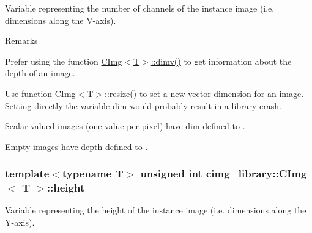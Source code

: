 Variable representing the number of channels of the instance image (i.e. dimensions along the V-\/axis). 

\begin{DoxyRemark}{Remarks}

\begin{DoxyItemize}
\item Prefer using the function \hyperlink{structcimg__library_1_1_c_img_ad30f8300f32a94a80e1e06c84a45de49}{CImg$<$T$>$::dimv()} to get information about the depth of an image.
\item Use function \hyperlink{structcimg__library_1_1_c_img_a84970d569f01fc5f9370d9cc84428903}{CImg$<$T$>$::resize()} to set a new vector dimension for an image. Setting directly the variable {\ttfamily dim} would probably result in a library crash.
\item Scalar-\/valued images (one value per pixel) have {\ttfamily dim} defined to {}.
\item Empty images have {\ttfamily depth} defined to {}. 
\end{DoxyItemize}
\end{DoxyRemark}
\hypertarget{structcimg__library_1_1_c_img_a30d575fd18ae525e507315de71b4806a}{
\subsubsection[{height}]{\setlength{\rightskip}{0pt plus 5cm}template$<$typename T$>$ unsigned int {\bf cimg\_\-library::CImg}$<$ T $>$::{\bf height}}}
\label{structcimg__library_1_1_c_img_a30d575fd18ae525e507315de71b4806a}


Variable representing the height of the instance image (i.e. dimensions along the Y-\/axis). 

